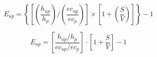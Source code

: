 
\begin{equation}
E_{up} = \left\{ \left[ \left( \frac{h_{up}}{h_p} \right) / \left( \frac{ec_{up}}{ec_p} \right) \right] \times \left[ 1 + \left( \frac{S}{V} \right) \right] \right\} - 1
\end{equation}


\begin{equation}
E_{up} = \left[ \frac{h_{up}/h_p}{ec_{up}/ec_p} \right] \cdot \left[ 1 + \frac{S}{V} \right] - 1
\end{equation}
